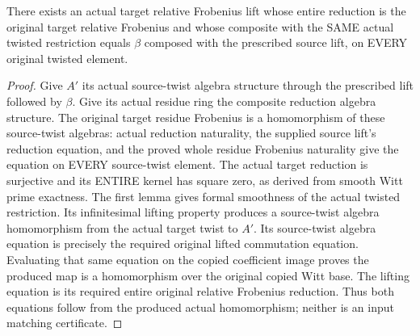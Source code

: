 \begin{theorem}
\label{thm:witt-two-etale-restricted-lift-exists}
\leanok
There exists an actual target relative Frobenius lift whose entire
reduction is the original target relative Frobenius and whose
composite with the SAME actual twisted restriction equals
$\beta$ composed with the prescribed source lift, on EVERY
original twisted element.
\end{theorem}
\begin{proof}
Give $A'$ its actual source-twist algebra structure through the
prescribed lift followed by $\beta$. Give its actual residue ring
the composite reduction algebra structure. The original target
residue Frobenius is a homomorphism of these source-twist
algebras: actual reduction naturality, the supplied source lift's
reduction equation, and the proved whole residue Frobenius
naturality give the equation on EVERY source-twist element.
The actual target reduction is surjective and its ENTIRE kernel
has square zero, as derived from smooth Witt prime exactness.
The first lemma gives formal smoothness of the actual twisted
restriction. Its infinitesimal lifting property produces a
source-twist algebra homomorphism from the actual target twist
to $A'$. Its source-twist algebra equation is precisely the
required original lifted commutation equation. Evaluating that
same equation on the copied coefficient image proves the
produced map is a homomorphism over the original copied Witt
base. The lifting equation is its required entire original
relative Frobenius reduction. Thus both equations follow from
the produced actual homomorphism; neither is an input matching
certificate.
\end{proof}

